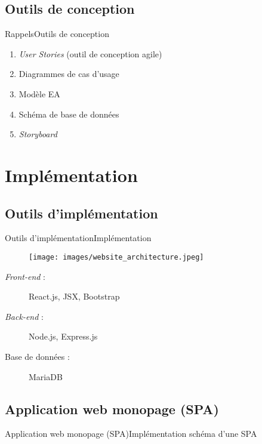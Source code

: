 \documentclass[usenames,dvipsnames]{beamer}
\begin{document}
\subsection{Outils de conception}
\begin{frame}{Rappels}{Outils de conception}
  \begin{enumerate}
    \item \textit{User Stories} (outil de conception agile)
    \item Diagrammes de cas d'usage
    \item Modèle EA
    \item Schéma de base de données
    \item \textit{Storyboard}
  \end{enumerate}
\end{frame}
\section{Implémentation}
\subsection{Outils d'implémentation}
\begin{frame}{Outils d'implémentation}{Implémentation}
  \begin{figure}[!ht]
    \centering
    \texttt{[image: images/website\_architecture.jpeg]}
  \end{figure}

  \begin{description}
    \item [\textit{Front-end} :] React.js, JSX, Bootstrap
    \item [\textit{Back-end} :] Node.js, Express.js
    \item [Base de données :] MariaDB
  \end{description}
\end{frame}

\subsection{Application web monopage (SPA)}
\begin{frame}{Application web monopage (SPA)}{Implémentation}
schéma d'une SPA
\end{frame}
\end{document}
